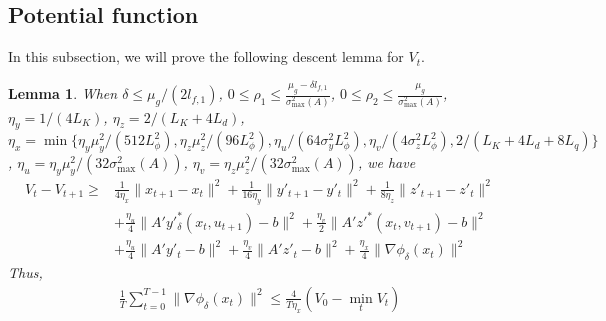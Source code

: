 \documentclass{article}
\theoremstyle{plain}
\newtheorem{lemma}[theorem]{Lemma}
\theoremstyle{definition}
\theoremstyle{remark}
\begin{document}
\subsection{Potential function}
In this subsection, we will prove the following descent lemma for $V_t$.
\begin{lemma}
    When  $\delta\leq \mu_g/(2l_{f,1})$, $0\leq \rho_1\leq \frac{\mu_g-\delta l_{f,1}}{\sigma_{\max}^2(A)}$, $0\leq \rho_2\leq \frac{\mu_g}{\sigma_{\max}^2(A)}$, $\eta_y=1/(4L_K)$, $\eta_z=2/(L_K+4L_d)$, $\eta_x=\min\{\eta_y\mu_y^2/(512L_\phi^2), \eta_z\mu_z^2/(96L_\phi^2), \eta_u/(64\sigma_y^2L_\phi^2), \eta_v/(4\sigma_z^2L_\phi^2), 2/(L_K+4L_d+8L_q)\}$, $\eta_u=\eta_y\mu_y^2/(32\sigma_{\max}^2(A))$, $\eta_v=\eta_z\mu_z^2/(32\sigma_{\max}^2(A))$, we have
\begin{align*}\nonumber
    V_t-V_{t+1}\geq&\frac{1}{4\eta_x}\|x_{t+1}-x_t\|^2+\frac{1}{16\eta_y}\|y'_{t+1}-y'_t\|^2+\frac{1}{8\eta_z}\|z'_{t+1}-z'_t\|^2\\ \nonumber
    &+\frac{\eta_u}{4}\|A'y'^*_\delta(x_t,u_{t+1})-b\|^2+\frac{\eta_v}{2}\|A'z'^*(x_t,v_{t+1})-b\|^2\\ 
    &+\frac{\eta_u}{4}\|A'y'_t-b\|^2+\frac{\eta_v}{4}\|A'z'_t-b\|^2+\frac{\eta_x}{4}\|\nabla \phi_\delta(x_t)\|^2
\end{align*}
Thus,
     \begin{align}
        \frac{1}{T}\sum_{t=0}^{T-1}\|\nabla \phi_\delta(x_{t})\|^2\leq \frac{4}{T\eta_x}(V_0-\min_tV_t )
    \end{align}  
\end{lemma}
\end{document}
